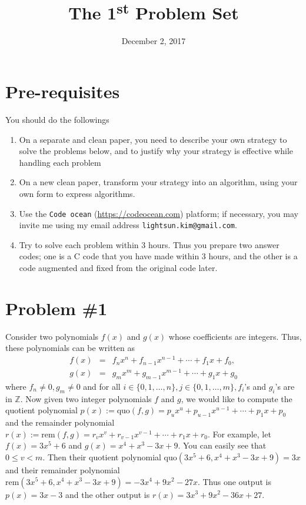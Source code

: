 \documentclass{article}
\date{December 2, 2017}
\title{The 1\textsuperscript{st} Problem Set}
\newcommand{\Z}{\mathbb{Z}}
\begin{document}
\maketitle
\section*{Pre-requisites}
You should do the followings
\begin{enumerate}
\item On a separate and clean paper,  you need to describe your own strategy to solve the problems below, and 
	to justify why your strategy is effective while handling each problem
\item On a new clean paper, transform your strategy into an algorithm, using your own form to express algorithms.
\item Use the \texttt{Code ocean} (\url{https://codeocean.com}) platform; if necessary, you may invite me using my email address 
\texttt{lightsun.kim@gmail.com}.
\item Try to solve each problem within 3 hours. Thus you prepare two answer codes; one is a C code that you have made within 3 hours, and the
other is a  code augmented and fixed from the original code later.
\end{enumerate}
\newpage

\section{Problem \#1}

Consider two polynomials $f(x)$ and $g(x)$ whose coefficients are integers. Thus, these polynomials can be written as
\begin{eqnarray*}
f(x)&=&f_nx^n+f_{n-1}x^{n-1}+\cdots+f_1x+f_0,\\
g(x)&=&g_mx^m+g_{m-1}x^{m-1}+\cdots+g_1x+g_0
\end{eqnarray*}
where $f_n\neq 0,g_m\neq 0$ and for all $i\in\{0,1,\ldots,n\},j\in\{0,1,\ldots,m\},f_i$'s and $g_i$'s are in $\Z$.
Now given two integer polynomials $f$ and $g$, we would like to compute the quotient polynomial $p(x):=\text{quo}(f,g)=p_ux^u+p_{u-1}x^{u-1}+\cdots+p_1x+p_0$ and 
the remainder polynomial $r(x):=\text{rem}(f,g)=r_vx^v+r_{v-1}x^{v-1}+\cdots+r_1x+r_0$. For example, let $f(x)=3x^5+6$ and $g(x)=x^4+x^3-3x+9$.
You can easily see that $0\leq v <m$.
Then their quotient polynomial $\text{quo}(3x^5+6,x^4+x^3-3x+9)=3x$ and 
their remainder polynomial $\text{rem}(3x^5+6,x^4+x^3-3x+9)=-3x^4+9x^2-27x$.
Thus one output is $p(x)=3x-3$ and the other output is $r(x)=3x^3+9x^2-36x+27$.
\end{document}
